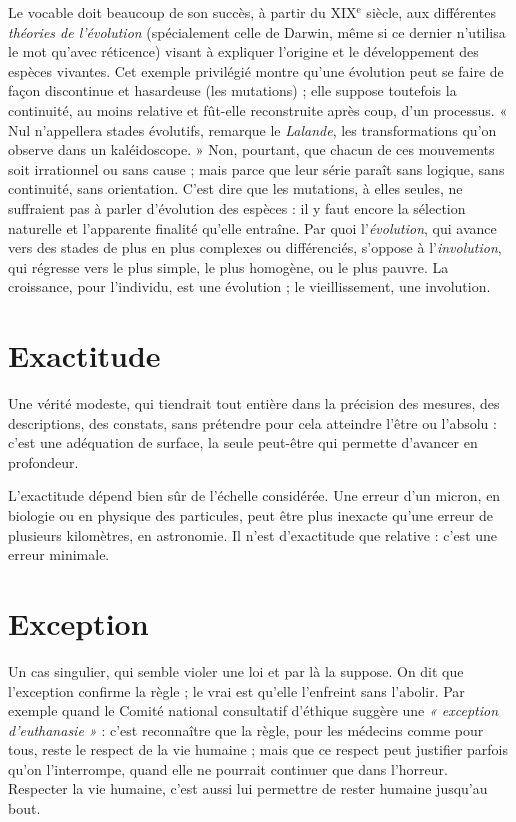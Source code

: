 Le vocable doit beaucoup de son succès, à partir du {\footnotesize XIX$^\text{e}$} siècle, aux différentes
{\it théories de l'évolution} (spécialement celle de Darwin, même si ce dernier
n’utilisa le mot qu'avec réticence) visant à expliquer l’origine et le développement
des espèces vivantes. Cet exemple privilégié montre qu’une évolution
peut se faire de façon discontinue et hasardeuse (les mutations) ; elle suppose
toutefois la continuité, au moins relative et fût-elle reconstruite après coup,
d’un processus. « Nul n’appellera stades évolutifs, remarque le {\it Lalande}, les
transformations qu’on observe dans un kaléidoscope. » Non, pourtant, que
chacun de ces mouvements soit irrationnel ou sans cause ; mais parce que leur
série paraît sans logique, sans continuité, sans orientation. C’est dire que les
mutations, à elles seules, ne suffraient pas à parler d'évolution des espèces : il y
faut encore la sélection naturelle et l’apparente finalité qu’elle entraîne. Par
quoi l’{\it évolution}, qui avance vers des stades de plus en plus complexes ou différenciés,
s'oppose à l’{\it involution}, qui régresse vers le plus simple, le plus homogène,
ou le plus pauvre. La croissance, pour l'individu, est une évolution ; le
vieillissement, une involution.

\section{Exactitude}
Une vérité modeste, qui tiendrait tout entière dans la précision
des mesures, des descriptions, des constats, sans prétendre
pour cela atteindre l’être ou l'absolu : c’est une adéquation de surface, la
seule peut-être qui permette d’avancer en profondeur.

L’exactitude dépend bien sûr de l’échelle considérée. Une erreur d’un
micron, en biologie ou en physique des particules, peut être plus inexacte
qu’une erreur de plusieurs kilomètres, en astronomie. Il n’est d’exactitude que
relative : c’est une erreur minimale.

\section{Exception}
Un cas singulier, qui semble violer une loi et par là la suppose.
On dit que l’exception confirme la règle ; le vrai est
qu’elle l’enfreint sans l’abolir. Par exemple quand le Comité national consultatif
d'éthique suggère une {\it « exception d'euthanasie »} : c’est reconnaître que la
règle, pour les médecins comme pour tous, reste le respect de la vie humaine ;
mais que ce respect peut justifier parfois qu’on l’interrompe, quand elle ne
pourrait continuer que dans l'horreur. Respecter la vie humaine, c’est aussi lui
permettre de rester humaine jusqu’au bout.

